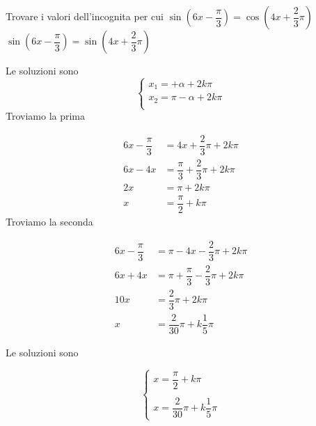 \begin{exercise}
	Trovare i valori dell'incognita per cui $\sin(6x-\dfrac{\pi}{3})=\cos(4x +\dfrac{2}{3}\pi)$
	\tcblower
$\sin(6x-\dfrac{\pi}{3})=\sin(4x +\dfrac{2}{3}\pi)$
	
	Le soluzioni sono 
	\[\begin{cases}
	x_1=+\alpha+2k\pi\\
	x_2=\pi-\alpha+2k\pi\\
	\end{cases}\]
	Troviamo la prima
	
	\begin{align*}
	6x-\dfrac{\pi}{3}&=4x +\dfrac{2}{3}\pi+2k\pi\\
6x-4x&=\dfrac{\pi}{3} +\dfrac{2}{3}\pi+2k\pi\\
	2x&=\pi+2k\pi\\
	x&=\dfrac{\pi}{2}+k\pi
	\end{align*}
	Troviamo la seconda
	
	\begin{align*}
		6x-\dfrac{\pi}{3}&=\pi-4x -\dfrac{2}{3}\pi+2k\pi\\
		6x+4x&=\pi+\dfrac{\pi}{3} -\dfrac{2}{3}\pi+2k\pi\\
		10x&=\dfrac{2}{3}\pi+2k\pi\\
		x&=\dfrac{2}{30}\pi+k\dfrac{1}{5}\pi
	\end{align*}
	
	Le soluzioni sono
	
	\[\begin{cases}
		x=\dfrac{\pi}{2}+k\pi\\
		\\
	x=\dfrac{2}{30}\pi+k\dfrac{1}{5}\pi
	\end{cases}\]
\end{exercise}

